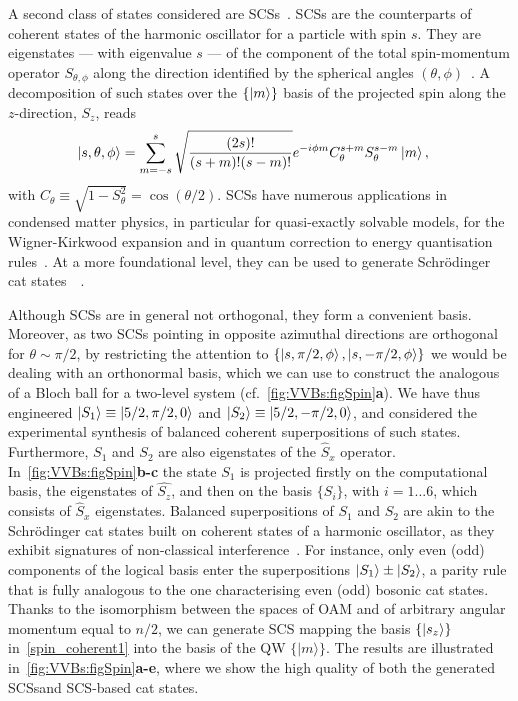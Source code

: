 A second class of states considered are \acp{SCS}~\cite{radcliffe1971some,arecchi1972atomic,agarwal1997atomic,markham2003classicality,chryssomalakos2018geometry}.
\acp{SCS} are the counterparts of coherent states of the harmonic oscillator for a particle with spin $s$. They are eigenstates --- with eigenvalue $s$ --- of the component of the total spin-momentum operator $S_{\theta,\phi}$ along the direction identified by the spherical angles $(\theta, \phi)$~\cite{arecchi1972atomic,agarwal1997atomic,ulyanov1999spin,lee2015visualizing}.
A decomposition of such states over the $\{\ket{m}\}$ basis of the projected spin along the $z$-direction, $S_z$, reads
\begin{equation}
\begin{aligned}
	\ket{s,\theta,\phi} &=
		\sum_{m=-s}^{s}
		\sqrt{\frac{(2s)!}{(s+m)!(s-m)!}} e^{-i\phi m} C_\theta^{s+m} S_\theta^{s-m}\ket{m},
\end{aligned}
\label{spin_coherent1}
\end{equation}
with $C_\theta\equiv\sqrt{1-S^2_\theta}=\cos(\theta/2)$. \acp{SCS} have numerous applications in condensed matter physics, in particular for quasi-exactly solvable models, for the Wigner-Kirkwood expansion and in quantum correction to energy quantisation rules~\cite{ulyanov1999spin}. At a more foundational level, they can be used to generate Schrödinger cat states~~\cite{agarwal1997atomic}. 


Although \acp{SCS} are in general not orthogonal, they form a convenient basis. Moreover, as two \acp{SCS} pointing in opposite azimuthal directions are orthogonal for $\theta\sim\pi/2$, by restricting the attention to $\{\ket{s,\pi/2,\phi},\ket{s,-\pi/2,\phi}\}$ we would be dealing with an orthonormal basis, which we can use to construct the analogous of a Bloch ball for a two-level system (cf.~\cref{fig:VVBs:figSpin}\textbf{a}). We have thus engineered $\ket{S_1}\equiv\ket{5/2,\pi/2,0}$ and $\ket{S_2}\equiv\ket{5/2,-\pi/2,0}$, and considered the experimental synthesis of balanced coherent superpositions of such states.
Furthermore, $S_1$ and $S_2$ are also eigenstates of the $\hat{S}_x$ operator. In~\cref{fig:VVBs:figSpin}\textbf{b-c} the state $S_1$ is projected firstly on the computational basis, the eigenstates of $\hat{S_z}$, and then on the basis $\{S_i\}$, with $i=1...6$, which consists of $\hat{S}_x$ eigenstates. Balanced superpositions of $S_1$ and $S_2$ are akin to the Schrödinger cat states built on coherent states of a harmonic oscillator, as they exhibit signatures of non-classical interference~\cite{agarwal1997atomic}. For instance, only even (odd) components of the logical basis enter the superpositions $\ket{S_1}\pm\ket{S_2}$, a parity rule that is fully analogous to the one characterising even (odd) bosonic cat states. Thanks to the isomorphism between the spaces of \ac{OAM} and of arbitrary angular momentum equal to $n/2$, we can generate \ac{SCS} mapping the basis $\{ \ket{s_z}\}$ in~\cref{spin_coherent1} into the basis of the \ac{QW} $\{|m\rangle\}$. The results are illustrated in~\cref{fig:VVBs:figSpin}\textbf{a-e}, where we show the high quality of both the generated \acp{SCS}and \ac{SCS}-based cat states.

